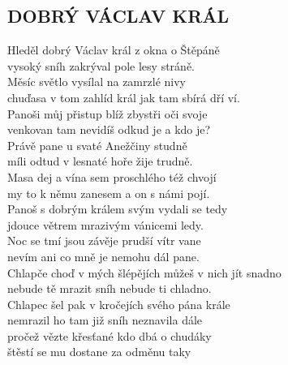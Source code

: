 \begin{flushleft}
	\section*{\Huge DOBRÝ VÁCLAV KRÁL}
\end{flushleft}

Hleděl dobrý Václav král z okna o Štěpáně\\
vysoký sníh zakrýval pole lesy stráně.\\
Měsíc světlo vysílal na zamrzlé nivy\\
chuďasa v tom zahlíd král jak tam sbírá dří \hspace{0,5cm} ví.\\

Panoši můj přistup blíž zbystři oči svoje\\
venkovan tam nevidíš odkud je a kdo je?\\
Právě pane u svaté Anežčiny studně\\
míli odtud v lesnaté hoře žije trudně.\\

Masa dej a vína sem proschlého též chvojí\\
my to k němu zanesem a on s námi pojí.\\
Panoš s dobrým králem svým vydali se tedy\\
jdouce větrem mrazivým vánicemi ledy.\\

Noc se tmí jsou závěje prudší vítr vane\\
nevím ani co mně je nemohu dál pane.\\
Chlapče choď v mých šlépějích můžeš v nich jít snadno\\
nebude tě mrazit sníh nebude ti chladno.\\

Chlapec šel pak v kročejích svého pána krále\\
nemrazil ho tam již sníh neznavila dále\\
pročež vězte křesťané kdo dbá o chudáky\\
štěstí se mu dostane za odměnu taky

\newpage
